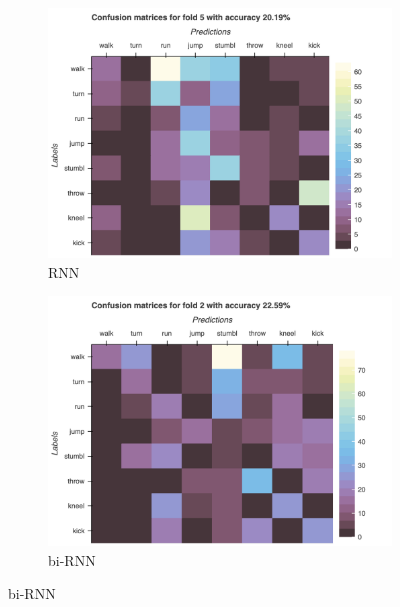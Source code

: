 		\begin{figure}[H]
			\centering
			\begin{subfigure}[b]{0.49\textwidth}
				\centering
				\includegraphics[width=\textwidth]{img/RNN-confusion_matrix_drop.png}
				\caption{RNN}
			\end{subfigure}
			\hfill
			\begin{subfigure}[b]{0.49\textwidth}
				\centering
				\includegraphics[width=\textwidth]{img/bi-RNN-Confusion_matrix_drop.png}
				\caption{bi-RNN}
			\end{subfigure}
		\end{figure}
